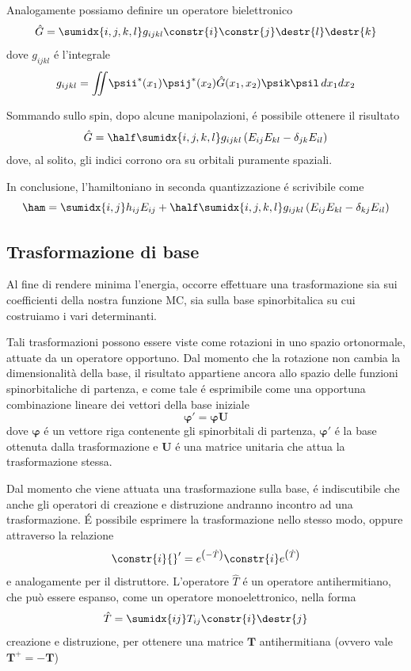 Analogamente possiamo definire un operatore bielettronico
$$
\hat{G} = \sumidx{i,j,k,l} g_{ijkl} \constr{i}\constr{j}\destr{l}\destr{k}
$$
dove $g_{ijkl}$ \'e l'integrale
$$
g_{ijkl} = \int \! \! \! \! \int \! \psii^*(x_1) \psij^*(x_2) \hat{G}(x_1,x_2) \psik
\psil \, dx_1 dx_2
$$

Sommando sullo spin, dopo alcune manipolazioni, \'e possibile ottenere il
risultato
$$
\hat{G} = \half \sumidx{i,j,k,l} g_{ijkl} \left( E_{ij} E_{kl} -
\delta_{jk} E_{il} \right)
$$
dove, al solito, gli indici corrono ora su orbitali puramente spaziali.

In conclusione, l'hamiltoniano in seconda quantizzazione \'e scrivibile
come
$$
\ham = \sumidx{i,j} h_{ij} E_{ij} + \half \sumidx{i,j,k,l} g_{ijkl}
\left( E_{ij} E_{kl} - \delta_{kj} E_{il} \right)
$$

\subsection{Trasformazione di base}

Al fine di rendere minima l'energia, occorre effettuare una trasformazione 
sia sui coefficienti della nostra funzione MC, sia sulla base spinorbitalica 
su cui costruiamo i vari determinanti.

Tali trasformazioni possono essere viste come rotazioni in uno spazio
ortonormale, attuate da un operatore opportuno. Dal momento che la
rotazione non cambia la dimensionalit\`a della base, il risultato
appartiene ancora allo spazio delle funzioni spinorbitaliche di
partenza, e come tale \'e esprimibile come una opportuna combinazione
lineare dei vettori della base iniziale
$$
\mathbf{\varphi}' = \mathbf{\varphi}\mathbf{U}
$$
dove $\mathbf{\varphi}$ \'e un vettore riga contenente gli spinorbitali di
partenza, $\mathbf{\varphi}'$ \'e la base ottenuta dalla trasformazione e
$\mathbf{U}$ \'e una matrice unitaria che attua la trasformazione stessa.

Dal momento che viene attuata una trasformazione sulla base, \'e
indiscutibile che anche gli operatori di creazione e distruzione
andranno incontro ad una trasformazione. \'E possibile esprimere la
trasformazione nello stesso modo, oppure attraverso la relazione
$$
\constr{i}{}^\prime = e^{\left(-\hat{T}\right)} \constr{i}
e^{\left(\hat{T}\right)}
$$
e analogamente per il distruttore. L'operatore $\hat{T}$ \'e un operatore
antihermitiano, che pu\`o essere espanso, come un operatore
monoelettronico, nella forma
$$
\hat{T}=\sumidx{ij}T_{ij}\constr{i}\destr{j}
$$
creazione e distruzione, per ottenere una matrice $\mathbf{T}$
antihermitiana (ovvero vale $\mathbf{T}^{+} = - \mathbf{T}$)

